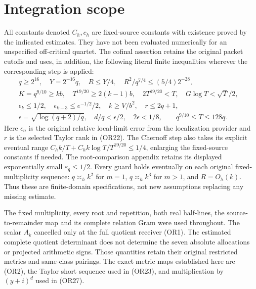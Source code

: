 \section{Integration scope}
All constants denoted \(C_h,c_h\) are fixed-source constants with
existence proved by the indicated estimates.  They have not been
evaluated numerically for an unspecified off-critical quartet.
The cofinal assertion retains the original packet cutoffs and uses,
in addition, the following literal finite inequalities wherever the
corresponding step is applied:
\[
 \begin{gathered}
 q\geq2^{16},\quad Y=2^{-16}q,\quad R\leq Y/4,\quad
 R^2/q^{7/4}\leq(5/4)2^{-28},\\
 K=q^{9/10}\geq kb,\quad
 T^{19/20}\geq2(k-1)b,\quad
 2T^{19/20}<T,\quad G\log T<\sqrt T/2,\\
 \epsilon_k\leq1/2,\quad
 \epsilon_{k-3}\leq e^{-1/2}/2,\quad k\geq V/b^2,\quad
 r\leq2q+1,\\
 \epsilon=\sqrt{\log(q+2)/q},\quad
 d/q<\epsilon/2,\quad 2\epsilon<1/8 ,
 \qquad q^{9/10}\leq T\leq128q .
 \end{gathered}                                      \tag{OR41}
\]
Here \(\epsilon_n\) is the original relative local-limit error
from the localization provider and \(r\) is the selected Taylor
rank in (OR22).  The Chernoff step also takes its explicit eventual
range \(C_hk/T+C_hk\log T/T^{19/20}\leq1/4\), enlarging the
fixed-source constants if needed.  The root-comparison appendix
retains its displayed exponentially small \(\varepsilon_q\leq1/2\).
Every guard holds eventually on each original fixed-multiplicity
sequence: \(q\asymp_h k^2\) for \(m=1\), \(q\asymp_h k^3\) for
\(m>1\), and \(R=O_h(k)\).  Thus these are finite-domain
specifications, not new assumptions replacing any missing estimate.

The fixed multiplicity, every root and repetition, both real
half-lines, the source-to-remainder map and its complete relation
Gram were used throughout.  The scalar \(A_k\) cancelled only at
the full quotient receiver (OR1).  The estimated complete
quotient determinant does not determine the seven absolute
allocations or projected arithmetic signs.  Those quantities
retain their original restricted metrics and same-class pairings.
The exact metric maps established here are (OR2), the Taylor
short sequence used in (OR23), and multiplication by \((y+i)^d\)
used in (OR27).



\endgroup

